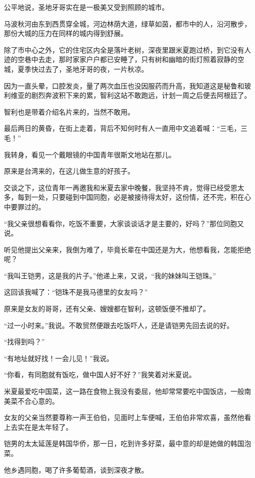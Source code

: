 \par 公平地说，圣地牙哥实在是一极美又受到照顾的城市。
\par 马波秋河由东到西贯穿全城，河边林荫大道，绿草如茵，都市中的人，沿河散步，那份大城的压力在同样的城内得到舒展。
\par 除了市中心之外，它的住宅区内全是落叶老树，深夜里跟米夏跑过桥，到它没有人迹的空巷中去走，那时家家户户都已安睡了，只有树和幽暗的街灯照着寂静的空城，夏季快过去了，圣地牙哥的夜，一片秋凉。
\par 因为一直头晕，口腔发炎，量了两次血压也没因服药而升高，我知道这是秘鲁和玻利维亚的剧烈奔波积下来的累，智利这站不敢跑远，计划一周之后便去阿根廷了。
\par 智利也是带着介绍名片来的，当然不敢用。
\par 最后两日的黄昏，在街上走着，背后不知何时有人一直用中文追着喊：“三毛，三毛！”
\par 我转身，看见一个戴眼镜的中国青年很斯文地站在那儿。
\par 原来是台湾来的，在这儿做生意的好孩子。
\par 交谈之下，这位青年一再邀我和米夏去家中晚餐，我坚持不肯，觉得已经受恩太多，每到一处，只要碰到中国同胞，必是被接待得太好，这份情，还不完，积在心中要罪过的。
\par “我父亲很想看看你，吃饭不重要，大家谈谈话才是主要的，好吗？”那位同胞又说。
\par 听见他提出父亲来，我倒为难了，毕竟长辈在中国还是为大，他想看我，怎能拒绝呢？
\par “我叫王铠男，这是我的片子。”他递上来，又说，“我的妹妹叫王铠珠。”
\par 这回该我喊了：“铠珠不是我马德里的女友吗？”
\par 原来是女友的哥哥，还有父亲、嫂嫂都在智利，这顿饭便不推却了。
\par “过一小时来。”我说。不敢贸然便跟去吃饭吓人，还是请铠男先回去说的好。
\par “找得到吗？”
\par “有地址就好找！一会儿见！”我说。
\par “你看，有同胞就有饭吃，做中国人好不好？”我笑着对米夏说。
\par 米夏最爱吃中国菜，这一路在食物上我没有委屈，他却常常要吃中国饭店，一般南美菜不合心意的。
\par 女友的父亲当然要尊称一声王伯伯，见面时上车便喊，王伯伯非常欢喜，虽然他看上去实在是太年轻了。
\par 铠男的太太延莲是韩国华侨，那一日，吃到许多好菜，最中意的却是她做的韩国泡菜。
\par 他乡遇同胞，喝了许多葡萄酒，谈到深夜才散。
